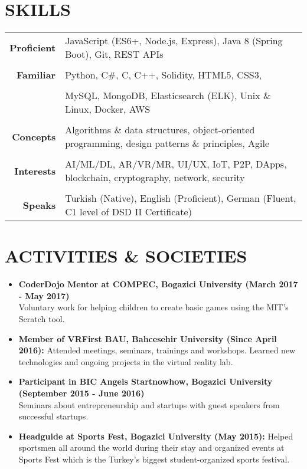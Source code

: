 \documentclass[a4paper, 10pt]{article}
\begin{document}
\section{SKILLS}
{\renewcommand{\arraystretch}{0.7}
\begin{tabular}{r p{15.4cm}}
    \textbf{Proficient} & JavaScript (ES6+, Node.js, Express), Java 8 (Spring Boot), Git, REST APIs\\\\
    \textbf{Familiar} & Python, C\#, C, C++, Solidity, HTML5, CSS3,\\\\
    & MySQL, MongoDB, Elasticsearch (ELK), Unix \& Linux, Docker, AWS\\\\
    \textbf{Concepts} & Algorithms \& data structures, object-oriented programming, design patterns \& principles, Agile\\\\
    \textbf{Interests} & AI/ML/DL, AR/VR/MR, UI/UX, IoT, P2P, DApps, blockchain, cryptography, network, security\\\\
    \textbf{Speaks} & Turkish (Native), English (Proficient), German (Fluent, C1 level of DSD II Certificate)
\end{tabular}}

\section{ACTIVITIES \& SOCIETIES}
\begin{itemize}
    \item \textbf{CoderDojo Mentor at COMPEC, Bogazici University (March 2017 - May 2017)}\\
        Voluntary work for helping children to create basic games using the MIT's Scratch tool.
    \item \textbf{Member of VRFirst BAU, Bahcesehir University (Since April 2016):}
        Attended meetings, seminars, trainings and workshops. Learned new technologies and ongoing projects in the virtual reality lab.
    \item \textbf{Participant in BIC Angels Startnowhow, Bogazici University (September 2015 - June 2016)}\\
        Seminars about entrepreneurship and startups with guest speakers from successful startups.
    \item \textbf{Headguide at Sports Fest, Bogazici University (May 2015):}
        Helped sportsmen all around the world during their stay and organized events at Sports Fest which is the Turkey's biggest student-organized sports festival.
\end{itemize}
\end{document}
